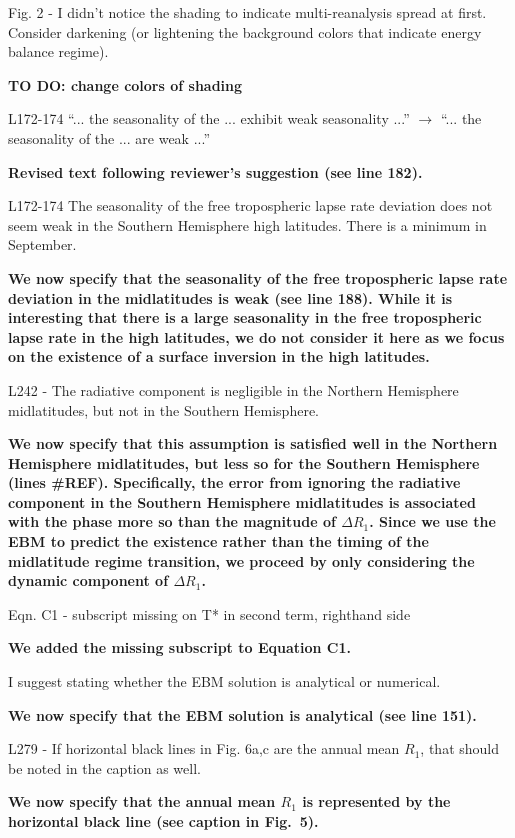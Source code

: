 \documentclass{article}
\begin{document}
Fig. 2 - I didn't notice the shading to indicate multi-reanalysis spread at first. Consider darkening (or lightening the background colors that indicate energy balance regime).

{\color{red}\textbf{TO DO: change colors of shading}}

L172-174 ``... the seasonality of the ... exhibit weak seasonality ...'' $\rightarrow$ ``... the seasonality of the ... are weak ...''

\textbf{Revised text following reviewer's suggestion (see line 182).}

L172-174 The seasonality of the free tropospheric lapse rate deviation does not seem weak in the Southern Hemisphere high latitudes. There is a minimum in September.

\textbf{We now specify that the seasonality of the free tropospheric lapse rate deviation in the midlatitudes is weak (see line 188). While it is interesting that there is a large seasonality in the free tropospheric lapse rate in the high latitudes, we do not consider it here as we focus on the existence of a surface inversion in the high latitudes.}

L242 - The radiative component is negligible in the Northern Hemisphere midlatitudes, but not in the Southern Hemisphere.

\textbf{We now specify that this assumption is satisfied well in the Northern Hemisphere midlatitudes, but less so for the Southern Hemisphere (lines \#REF). Specifically, the error from ignoring the radiative component in the Southern Hemisphere midlatitudes is associated with the phase more so than the magnitude of $\Delta R_1$. Since we use the EBM to predict the existence rather than the timing of the midlatitude regime transition, we proceed by only considering the dynamic component of $\Delta R_1$.}

Eqn. C1 - subscript missing on T* in second term, righthand side

\textbf{We added the missing subscript to Equation C1.}

I suggest stating whether the EBM solution is analytical or numerical.

\textbf{We now specify that the EBM solution is analytical (see line 151).}

L279 - If horizontal black lines in Fig. 6a,c are the annual mean $R_1$, that should be noted in the caption as well.

\textbf{We now specify that the annual mean $R_1$ is represented by the horizontal black line (see caption in Fig.~5).}
\end{document}
